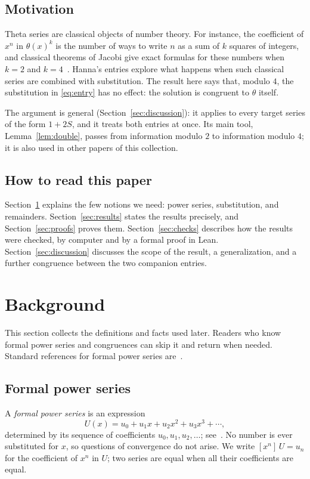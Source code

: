 \documentclass[11pt,a4paper]{article}
\theoremstyle{definition}
\theoremstyle{remark}
\newcommand{\coeff}[2]{[x^{#1}]\,#2}
\begin{document}
\subsection{Motivation}
Theta series are classical objects of number theory. For instance, the coefficient of $x^n$ in
$\theta(x)^k$ is the number of ways to write $n$ as a sum of $k$ squares of integers, and classical theorems of Jacobi
give exact formulas for these numbers when $k=2$ and $k=4$~\cite{hardywright}. Hanna's entries explore what happens when
such classical series are combined with substitution. The result here says that, modulo $4$, the substitution in
\eqref{eq:entry} has no effect: the solution is congruent to $\theta$ itself.

The argument is general (Section~\ref{sec:discussion}): it applies to every target series of the form $1+2S$, and it
treats both entries at once. Its main tool, Lemma~\ref{lem:double}, passes from information modulo $2$ to information
modulo $4$; it is also used in other papers of this collection.

\subsection{How to read this paper}
Section~\ref{sec:background} explains the few notions we need: power series, substitution, and remainders.
Section~\ref{sec:results} states the results precisely, and Section~\ref{sec:proofs} proves them.
Section~\ref{sec:checks} describes how the results were checked, by computer and by a formal proof in Lean.
Section~\ref{sec:discussion} discusses the scope of the result, a generalization, and a further congruence between the
two companion entries.
\section{Background}\label{sec:background}
This section collects the definitions and facts used later. Readers who know formal power series and congruences can skip it and return when needed. Standard references for formal power series are~\cite{niven,stanley}.
\subsection{Formal power series}
A \emph{formal power series} is an expression
\[
U(x)=u_0+u_1x+u_2x^2+u_3x^3+\cdots ,
\]
determined by its sequence of coefficients $u_0,u_1,u_2,\dots$; see~\cite{niven,stanley}. No number is ever
substituted for $x$, so questions of convergence do not arise. We write $\coeff{n}{U}=u_n$ for the coefficient of $x^n$ in $U$; two series are equal
when all their coefficients are equal.
\end{document}
